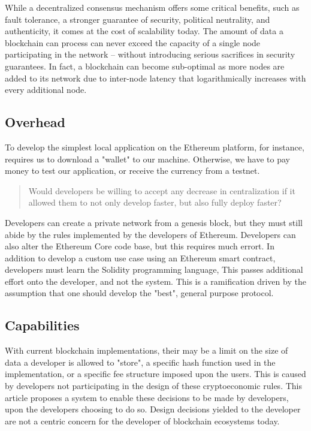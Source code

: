 \documentclass[12pt, titlepage, twocolumn]{report}
\begin{document}
While a decentralized consensus mechanism offers some critical benefits, such as fault tolerance, a stronger guarantee of security, political neutrality, and authenticity, it comes at the cost of scalability today. The amount of data a blockchain can process can never exceed the capacity of a single node participating in the network -- without introducing serious sacrifices in security guarantees. In fact, a blockchain can become sub-optimal as more nodes are added to its network due to inter-node latency that logarithmically increases with every additional node.
 

\subsection{Overhead}
To develop the simplest local application on the Ethereum platform, for instance, requires us to download a "wallet" to our machine. Otherwise, we have to pay money to test our application, or receive the currency from a testnet.

\begin{quotation}
Would developers be willing to accept any decrease in centralization if it allowed them to not only develop faster, but also fully deploy faster? 
 \end{quotation} 

Developers can create a private network from a genesis block, but they must still abide by the rules implemented by the developers of Ethereum. Developers can also alter the Ethereum Core code base, but this requires much errort. In addition to develop a custom use case using an Ethereum smart contract, developers must learn the Solidity programming language, This passes additional effort onto the developer, and not the system. This is a ramification driven by the assumption that one should develop the "best", general purpose protocol. 


\subsection{Capabilities}
With current blockchain implementations, their may be a limit on the size of data a developer is allowed to "store", a specific hash function used in the implementation, or a specific fee structure imposed upon the users. This is caused by developers not participating in the design of these cryptoeconomic rules. This article proposes a system to enable these decisions to be made by developers, upon the developers choosing to do so. Design decisions yielded to the developer are not a centric concern for the developer of blockchain ecosystems today. 
\end{document}
